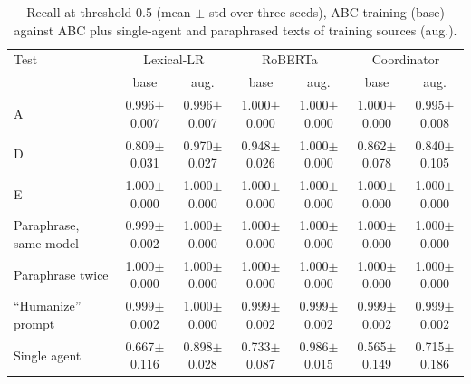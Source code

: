 \begin{table}[t]
\centering
\footnotesize
\caption{Recall at threshold 0.5 (mean $\pm$ std over three seeds), ABC training (base) against ABC plus single-agent and paraphrased texts of training sources (aug.).}
\label{tab:augmented}
\begin{tabular}{lcccccc}
\toprule
Test & \multicolumn{2}{c}{Lexical-LR} & \multicolumn{2}{c}{RoBERTa} & \multicolumn{2}{c}{Coordinator} \\
 & base & aug. & base & aug. & base & aug. \\
\midrule
A & 0.996$\pm$0.007 & 0.996$\pm$0.007 & 1.000$\pm$0.000 & 1.000$\pm$0.000 & 1.000$\pm$0.000 & 0.995$\pm$0.008 \\
D & 0.809$\pm$0.031 & 0.970$\pm$0.027 & 0.948$\pm$0.026 & 1.000$\pm$0.000 & 0.862$\pm$0.078 & 0.840$\pm$0.105 \\
E & 1.000$\pm$0.000 & 1.000$\pm$0.000 & 1.000$\pm$0.000 & 1.000$\pm$0.000 & 1.000$\pm$0.000 & 1.000$\pm$0.000 \\
Paraphrase, same model & 0.999$\pm$0.002 & 1.000$\pm$0.000 & 1.000$\pm$0.000 & 1.000$\pm$0.000 & 1.000$\pm$0.000 & 1.000$\pm$0.000 \\
Paraphrase twice & 1.000$\pm$0.000 & 1.000$\pm$0.000 & 1.000$\pm$0.000 & 1.000$\pm$0.000 & 1.000$\pm$0.000 & 1.000$\pm$0.000 \\
``Humanize'' prompt & 0.999$\pm$0.002 & 1.000$\pm$0.000 & 0.999$\pm$0.002 & 0.999$\pm$0.002 & 0.999$\pm$0.002 & 0.999$\pm$0.002 \\
Single agent & 0.667$\pm$0.116 & 0.898$\pm$0.028 & 0.733$\pm$0.087 & 0.986$\pm$0.015 & 0.565$\pm$0.149 & 0.715$\pm$0.186 \\
\bottomrule
\end{tabular}
\end{table}
